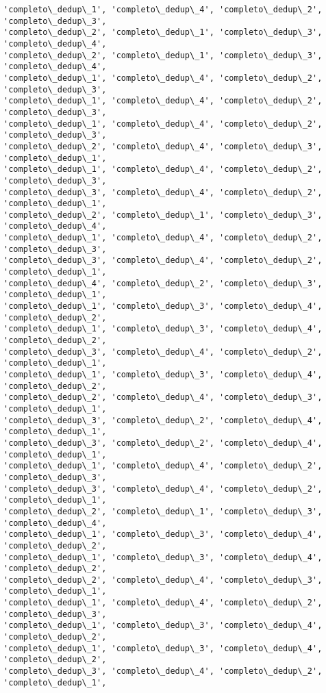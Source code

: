 \documentclass[11pt]{article}
\begin{document}
\begin{Verbatim}[commandchars=\\\{\}]
'completo\_dedup\_1', 'completo\_dedup\_4', 'completo\_dedup\_2', 'completo\_dedup\_3',
'completo\_dedup\_2', 'completo\_dedup\_1', 'completo\_dedup\_3', 'completo\_dedup\_4',
'completo\_dedup\_2', 'completo\_dedup\_1', 'completo\_dedup\_3', 'completo\_dedup\_4',
'completo\_dedup\_1', 'completo\_dedup\_4', 'completo\_dedup\_2', 'completo\_dedup\_3',
'completo\_dedup\_1', 'completo\_dedup\_4', 'completo\_dedup\_2', 'completo\_dedup\_3',
'completo\_dedup\_1', 'completo\_dedup\_4', 'completo\_dedup\_2', 'completo\_dedup\_3',
'completo\_dedup\_2', 'completo\_dedup\_4', 'completo\_dedup\_3', 'completo\_dedup\_1',
'completo\_dedup\_1', 'completo\_dedup\_4', 'completo\_dedup\_2', 'completo\_dedup\_3',
'completo\_dedup\_3', 'completo\_dedup\_4', 'completo\_dedup\_2', 'completo\_dedup\_1',
'completo\_dedup\_2', 'completo\_dedup\_1', 'completo\_dedup\_3', 'completo\_dedup\_4',
'completo\_dedup\_1', 'completo\_dedup\_4', 'completo\_dedup\_2', 'completo\_dedup\_3',
'completo\_dedup\_3', 'completo\_dedup\_4', 'completo\_dedup\_2', 'completo\_dedup\_1',
'completo\_dedup\_4', 'completo\_dedup\_2', 'completo\_dedup\_3', 'completo\_dedup\_1',
'completo\_dedup\_1', 'completo\_dedup\_3', 'completo\_dedup\_4', 'completo\_dedup\_2',
'completo\_dedup\_1', 'completo\_dedup\_3', 'completo\_dedup\_4', 'completo\_dedup\_2',
'completo\_dedup\_3', 'completo\_dedup\_4', 'completo\_dedup\_2', 'completo\_dedup\_1',
'completo\_dedup\_1', 'completo\_dedup\_3', 'completo\_dedup\_4', 'completo\_dedup\_2',
'completo\_dedup\_2', 'completo\_dedup\_4', 'completo\_dedup\_3', 'completo\_dedup\_1',
'completo\_dedup\_3', 'completo\_dedup\_2', 'completo\_dedup\_4', 'completo\_dedup\_1',
'completo\_dedup\_3', 'completo\_dedup\_2', 'completo\_dedup\_4', 'completo\_dedup\_1',
'completo\_dedup\_1', 'completo\_dedup\_4', 'completo\_dedup\_2', 'completo\_dedup\_3',
'completo\_dedup\_3', 'completo\_dedup\_4', 'completo\_dedup\_2', 'completo\_dedup\_1',
'completo\_dedup\_2', 'completo\_dedup\_1', 'completo\_dedup\_3', 'completo\_dedup\_4',
'completo\_dedup\_1', 'completo\_dedup\_3', 'completo\_dedup\_4', 'completo\_dedup\_2',
'completo\_dedup\_1', 'completo\_dedup\_3', 'completo\_dedup\_4', 'completo\_dedup\_2',
'completo\_dedup\_2', 'completo\_dedup\_4', 'completo\_dedup\_3', 'completo\_dedup\_1',
'completo\_dedup\_1', 'completo\_dedup\_4', 'completo\_dedup\_2', 'completo\_dedup\_3',
'completo\_dedup\_1', 'completo\_dedup\_3', 'completo\_dedup\_4', 'completo\_dedup\_2',
'completo\_dedup\_1', 'completo\_dedup\_3', 'completo\_dedup\_4', 'completo\_dedup\_2',
'completo\_dedup\_3', 'completo\_dedup\_4', 'completo\_dedup\_2', 'completo\_dedup\_1',

\end{Verbatim}
\end{document}
